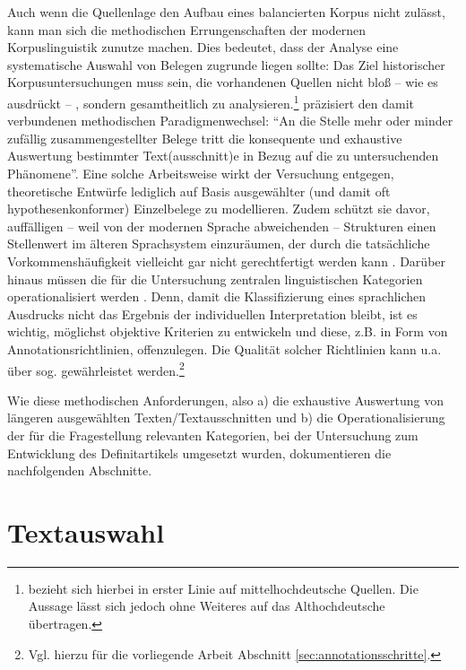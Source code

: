 Auch wenn die Quellenlage den Aufbau eines balancierten Korpus nicht zulässt, kann man sich die methodischen Errungenschaften der modernen Korpuslinguistik zunutze machen. Dies bedeutet, dass der Analyse eine systematische Auswahl von Belegen zugrunde liegen sollte: Das Ziel historischer Korpusuntersuchungen muss sein, die vorhandenen Quellen nicht bloß -- wie es \textcite[1310]{Wegera2000} ausdrückt -- , sondern gesamtheitlich zu analysieren.\footnote{\textcite{Wegera2000} bezieht sich hierbei in erster Linie auf mittelhochdeutsche Quellen. Die Aussage lässt sich jedoch ohne Weiteres auf das Althochdeutsche übertragen.} \textcite[382]{Fleischer2015} präzisiert den damit verbundenen methodischen Paradigmenwechsel:
"`An die Stelle mehr oder minder zufällig zusammengestellter Belege tritt die konsequente und exhaustive Auswertung bestimmter Text(ausschnitt)e in Bezug auf die zu untersuchenden Phänomene"'. Eine solche Arbeitsweise wirkt der Versuchung entgegen, theoretische Entwürfe lediglich auf Basis ausgewählter (und damit oft hypothesenkonformer) Einzelbelege zu modellieren. Zudem schützt sie davor, auffälligen -- weil von der modernen Sprache abweichenden -- Strukturen einen Stellenwert im älteren Sprachsystem einzuräumen, der durch die tatsächliche Vorkommenshäufigkeit vielleicht gar nicht gerechtfertigt werden kann \parencite[383]{Fleischer2015}. Darüber hinaus müssen die für die Untersuchung zentralen linguistischen Kategorien operationalisiert werden  \parencite[113--116]{Lemnitzer2015}. Denn, damit die Klassifizierung eines sprachlichen Ausdrucks nicht das Ergebnis der individuellen Interpretation bleibt, ist es wichtig, möglichst objektive Kriterien zu entwickeln und diese, z.B. in Form von Annotationsrichtlinien, offenzulegen. Die Qualität solcher Richtlinien kann u.a. über sog.  gewährleistet werden.\footnote{Vgl. hierzu für die vorliegende Arbeit Abschnitt \ref{sec:annotationsschritte}.} 

Wie diese methodischen Anforderungen, also a) die exhaustive Auswertung von längeren ausgewählten Texten/Textausschnitten und b) die Operationalisierung der für die Fragestellung relevanten Kategorien, bei der Untersuchung zum Entwicklung des Definitartikels umgesetzt wurden, dokumentieren die nachfolgenden Abschnitte.


\section{Textauswahl}\label{sec:textauswahl}

